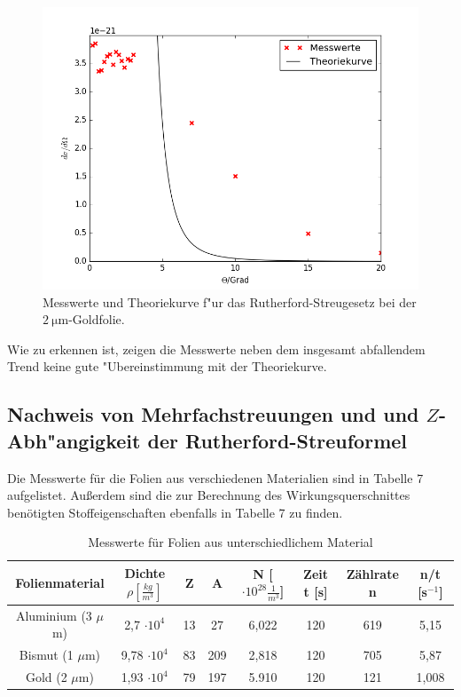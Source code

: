   \begin{figure}
    \centering
    \includegraphics[width=15cm]{skripte/ruther.png}
    \caption{Messwerte und Theoriekurve f"ur das Rutherford-Streugesetz bei der $\SI{2}{\micro \meter}$-Goldfolie.}
    \label{plot:ruther}
  \end{figure}

  Wie zu erkennen ist, zeigen die Messwerte neben dem insgesamt abfallendem Trend keine gute "Ubereinstimmung mit der Theoriekurve.





  \subsection{Nachweis von Mehrfachstreuungen und und $Z$-Abh"angigkeit der Rutherford-Streuformel}



Die Messwerte für die Folien aus verschiedenen Materialien sind in Tabelle 7 aufgelistet. Außerdem sind die zur Berechnung des Wirkungsquerschnittes benötigten Stoffeigenschaften ebenfalls in Tabelle 7 zu finden. 

\begin{table}[H] 
\centering
\begin{tabular}{c|c c c c c c c}

	Folienmaterial &Dichte $\rho [\frac{kg}{m^3}]$& Z & A & N [$\cdot 10^{28} \frac{1}{m^3}$]& Zeit t [s]& Zählrate n & n/t [s$^{-1}$]  \\ 
	\hline 
	Aluminium (3 $\mu$m) &2,7 $\cdot 10^{4}$& 13 & 27& 6,022 & 120  & 619 & 5,15  \\ 

	Bismut (1 $\mu$m)& 9,78 $\cdot 10^{4}$  & 83 & 209& 2,818 & 120 & 705 & 5,87 \\ 

	Gold (2 $\mu$m) & 1,93   $\cdot 10^{4}$ & 79 & 197 & 5.910 & 120 & 121 & 1,008 \\ 

\end{tabular} 
	\caption{Messwerte für Folien aus unterschiedlichem Material} 
\end{table}
 
